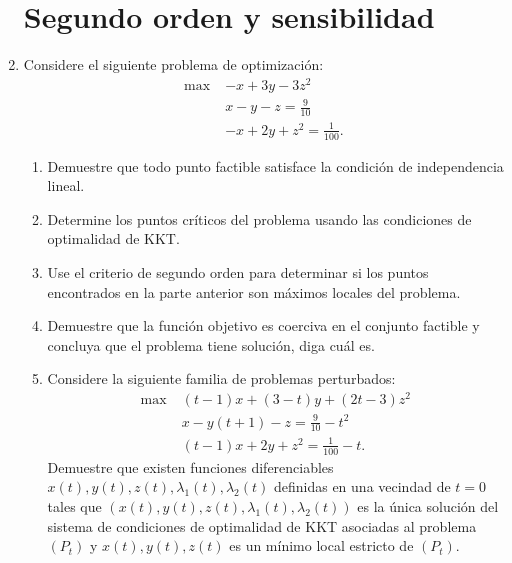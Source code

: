 \documentclass{article}
\begin{document}
\begin{enumerate}
\section{Segundo orden y sensibilidad}
	\item Considere el siguiente problema de optimización:
		\begin{align*}
			\max \; &-x + 3y - 3z^2 \\
				& x - y - z = \frac{9}{10} \\
				& -x + 2y + z^2 = \frac{1}{100}.
		\end{align*}
		\begin{enumerate}
			\item Demuestre que todo punto factible satisface la condición de independencia lineal.
			\item Determine los puntos críticos del problema usando las condiciones de optimalidad de KKT.
			\item Use el criterio de segundo orden para determinar si los puntos encontrados en la parte anterior son máximos locales del problema.
			\item Demuestre que la función objetivo es coerciva en el conjunto factible y concluya que el problema tiene solución, diga cuál es.
			\item Considere la siguiente familia de problemas perturbados:
				\begin{align*}
					\max \; & (t - 1)x + (3-t)y + (2t - 3)z^2 \tag{$P_t$} \\
						& x - y(t+1) - z = \frac{9}{10} - t^2 \\
						& (t - 1)x + 2y + z^2 = \frac{1}{100} - t.
				\end{align*}
				Demuestre que existen funciones diferenciables \(x(t), y(t), z(t), \lambda_1(t), \lambda_2(t)\) definidas en una vecindad de \(t = 0\) tales que \((x(t), y(t), z(t), \lambda_1(t), \lambda_2(t))\) es la única solución del sistema de condiciones de optimalidad de KKT asociadas al problema \((P_t)\) y \(x(t), y(t), z(t)\) es un mínimo local estricto de \((P_t)\).
		\end{enumerate}
\end{enumerate}
\end{document}
